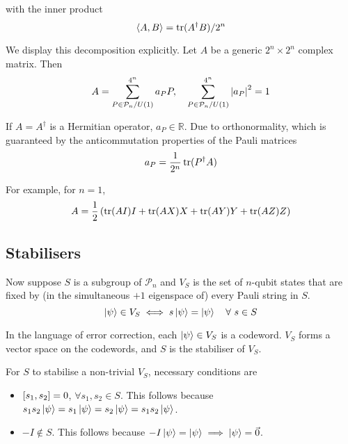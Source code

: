 \documentclass[10pt]{article}
\begin{document}
with the inner product
\begin{equation}
\ev{A,B} = \trace(A^\dagger B)/2^n
\end{equation} 

We display this decomposition explicitly. Let $A$ be a generic $2^n \times 2^n$ complex matrix. Then
\begin{equation}
A = \sum_{P\in \mathcal{P}_n / U(1)}^{4^n} a_P P, 
\quad
\sum_{P\in \mathcal{P}_n / U(1)}^{4^n} \abs{a_P}^2 = 1
\end{equation}

If $A = A^\dagger$ is a Hermitian operator, $a_P \in \mathbb{R}$. Due to orthonormality, which is guaranteed by the anticommutation properties of the Pauli matrices
\begin{equation}
a_P = \frac{1}{2^n} \trace(P^\dagger A)
\end{equation}

For example, for $n=1$,
\begin{equation}
A = \frac{1}{2} \left( \trace(AI) I + \trace(AX) X + \trace(AY) Y + \trace(AZ) Z \right)
\end{equation}





\subsection{Stabilisers}

Now suppose $S$ is a subgroup of $\mathcal{P}_n$ and $V_S$ is the set of $n$-qubit states that are fixed by (in the simultaneous $+1$ eigenspace of) every Pauli string in $S$.
\begin{equation}
\ket{\psi} \in V_S \iff s \ket{\psi} = \ket{\psi} \quad \forall \ s \in S
\end{equation}

In the language of error correction, each $\ket{\psi} \in V_S$ is a codeword. $V_S$ forms a vector space on the codewords, and $S$ is the stabiliser of $V_S$. 

For $S$ to stabilise a non-trivial $V_S$, necessary conditions are

\begin{itemize}
\item $\comm{s_1}{s_2}=0$, $\forall s_1, s_2 \in S$. This follows because $s_1 s_2 \ket{\psi} = s_1 \ket{\psi} = s_2 \ket{\psi} = s_1 s_2 \ket{\psi}$.
\item $-I \notin S$. This follows because $-I \ket{\psi} = \ket{\psi} \implies \ket{\psi} = \vec{0}$.
\end{itemize}
\end{document}
